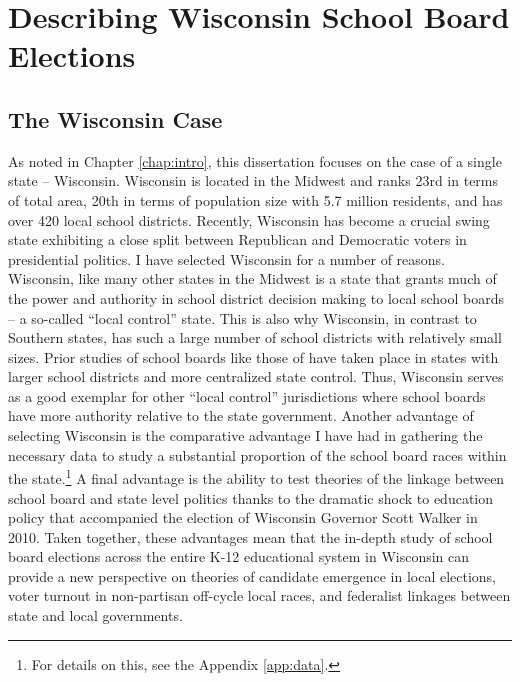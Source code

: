 \chapter{Describing Wisconsin School Board Elections}
\label{chap:wisco}




\section{The Wisconsin Case}

As noted in Chapter \ref{chap:intro}, this dissertation focuses on the case of a 
single state -- Wisconsin. Wisconsin is located in the Midwest and ranks 
23rd in terms of total area, 20th in terms of population size with 5.7 million residents, 
and has over 420 local school districts. Recently, Wisconsin has become a crucial swing state 
exhibiting a close split between Republican and Democratic voters in presidential 
politics. I have selected Wisconsin for a number of reasons. Wisconsin, like many 
other states in the Midwest is a state that grants much of the power and authority 
in school district decision making to local school boards -- a so-called ``local 
control'' state. This is also why Wisconsin, in contrast to Southern states, 
has such a large number of school districts with relatively small sizes. 
Prior studies of school boards like those of \citet{RefWorks:311,RefWorks:214} have 
taken place in states with larger school districts and more centralized state 
control. Thus, Wisconsin serves as a good exemplar for other ``local control'' 
jurisdictions where school boards have more authority relative to the state 
government. Another advantage of selecting Wisconsin is the comparative advantage
I have had in gathering the necessary data to study a substantial proportion of the 
school board races within the state.\footnote{For details on this, see the 
Appendix \ref{app:data}.} A final advantage is the ability 
to test theories of the linkage between school board and state level politics thanks 
to the dramatic shock to education policy that accompanied the election of Wisconsin 
Governor Scott Walker in 2010. Taken together, these advantages mean that the in-depth 
study of school board elections across the entire K-12 educational system in Wisconsin 
can provide a new perspective on theories of candidate emergence in local elections, 
voter turnout in non-partisan off-cycle local races, and federalist linkages between 
state and local governments. 

